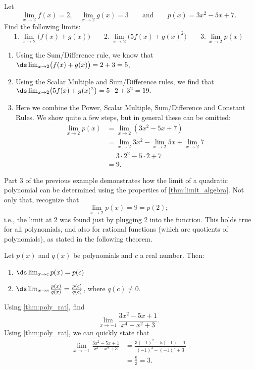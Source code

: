\begin{example}\label{ex_basic_limit_1}
Let
\[
 \lim_{x\to 2} f(x)=2,\quad\lim_{x\to 2} g(x) = 3\qquad\text{and}\qquad
 p(x) = 3x^2-5x+7.
\]
Find the following limits:
\[
1.~\lim_{x\to 2} \bigl(f(x) + g(x)\bigr)\qquad
2.~\lim_{x\to 2} \bigl(5f(x) + g(x)^2\bigr)\qquad
3.~\lim_{x\to 2} p(x)
\]
\solution
\begin{enumerate}
	\item	Using the Sum/Difference rule, we know that $\ds \lim_{x\to 2} \bigl(f(x) + g(x)\bigr) = 2+3 =5$.
	\item	Using the Scalar Multiple and Sum/Difference rules, we find that\\ $\ds \lim_{x\to 2} \bigl(5f(x) + g(x)^2\bigr) = 5\cdot 2 + 3^2 = 19.$
	\item	Here we combine the Power, Scalar Multiple, Sum/Difference and Constant Rules. We show quite a few steps, but in general these can be omitted:
	\begin{align*}
		\lim_{x\to 2} p(x) &= \lim_{x\to 2} (3x^2-5x+7) \\
		&= \lim_{x\to 2} 3x^2-\lim_{x\to 2} 5x+\lim_{x\to 2}7 \\
		&= 3\cdot 2^2 - 5\cdot 2+7 \\
		&= 9.
	\end{align*}
\end{enumerate}
\end{example}

Part 3 of the previous example demonstrates how the limit of a quadratic polynomial can be determined using the properties of \autoref{thm:limit_algebra}. Not only that, recognize that
\[\lim_{x\to 2} p(x) = 9 = p(2);\]
i.e., the limit at 2 was found just by plugging 2 into the function. This holds true for all polynomials, and also for rational functions (which are quotients of polynomials), as stated in the following theorem.

\begin{theorem}\label{thm:poly_rat}
Let $p(x)$ and $q(x)$ be polynomials and $c$ a real number. Then:
\begin{enumerate}
\item	$\ds \lim_{x\to c} p(x) = p(c)$
\item	$\ds \lim_{x\to c} \frac{p(x)}{q(x)} = \frac{p(c)}{q(c)}$, where $q(c) \neq 0$.
\end{enumerate}
\end{theorem}

\begin{example}\label{ex_limit_rat}
Using \autoref{thm:poly_rat}, find
\[\lim_{x\to -1} \frac{3x^2-5x+1}{x^4-x^2+3}.\]
\solution
Using \autoref{thm:poly_rat}, we can quickly state that 
	\begin{align*}
		\lim_{x\to -1}\frac{3x^2-5x+1}{x^4-x^2+3}
		&= \frac{3(-1)^2-5(-1)+1}{(-1)^4-(-1)^2+3} \\
		&= \frac{9}{3} =3.
	\end{align*}
\end{example}

